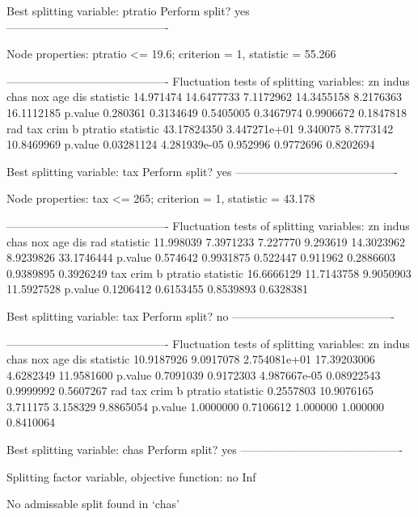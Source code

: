 \documentclass{Z}
\begin{document}
\begin{Schunk}
\begin{Soutput}
Best splitting variable: ptratio
Perform split? yes
-------------------------------------------

Node properties:
ptratio <= 19.6; criterion = 1, statistic = 55.266

-------------------------------------------
Fluctuation tests of splitting variables:
                 zn      indus      chas        nox       age        dis
statistic 14.971474 14.6477733 7.1172962 14.3455158 8.2176363 16.1112185
p.value    0.280361  0.3134649 0.5405005  0.3467974 0.9906672  0.1847818
                  rad          tax     crim         b    ptratio
statistic 43.17824350 3.447271e+01 9.340075 8.7773142 10.8469969
p.value    0.03281124 4.281939e-05 0.952996 0.9772696  0.8202694

Best splitting variable: tax
Perform split? yes
-------------------------------------------

Node properties:
tax <= 265; criterion = 1, statistic = 43.178

-------------------------------------------
Fluctuation tests of splitting variables:
                 zn     indus     chas      nox        age       dis        rad
statistic 11.998039 7.3971233 7.227770 9.293619 14.3023962 8.9239826 33.1746444
p.value    0.574642 0.9931875 0.522447 0.911962  0.2886603 0.9389895  0.3926249
                 tax       crim         b    ptratio
statistic 16.6666129 11.7143758 9.9050903 11.5927528
p.value    0.1206412  0.6153455 0.8539893  0.6328381

Best splitting variable: tax
Perform split? no
-------------------------------------------

-------------------------------------------
Fluctuation tests of splitting variables:
                  zn     indus         chas         nox       age        dis
statistic 10.9187926 9.0917078 2.754081e+01 17.39203006 4.6282349 11.9581600
p.value    0.7091039 0.9172303 4.987667e-05  0.08922543 0.9999992  0.5607267
                rad        tax     crim        b   ptratio
statistic 0.2557803 10.9076165 3.711175 3.158329 9.8865054
p.value   1.0000000  0.7106612 1.000000 1.000000 0.8410064

Best splitting variable: chas
Perform split? yes
-------------------------------------------

Splitting factor variable, objective function: 
 no 
Inf 

No admissable split found in ‘chas’
\end{Soutput}
\end{Schunk}
\end{document}
